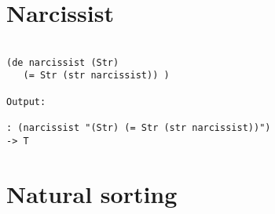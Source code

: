\section*{Narcissist}

\begin{verbatim}

(de narcissist (Str)
   (= Str (str narcissist)) )

Output:

: (narcissist "(Str) (= Str (str narcissist))")
-> T

\end{verbatim}

\section*{Natural sorting}

